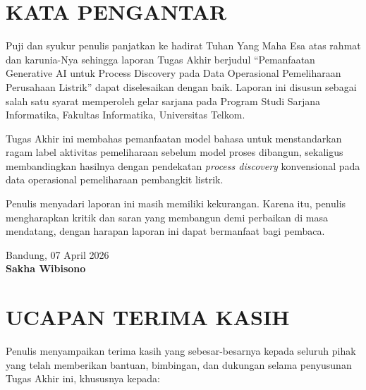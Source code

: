 \chapter*{KATA PENGANTAR}

Puji dan syukur penulis panjatkan ke hadirat Tuhan Yang Maha Esa atas rahmat dan karunia-Nya sehingga laporan Tugas Akhir berjudul ``Pemanfaatan Generative AI untuk Process Discovery pada Data Operasional Pemeliharaan Perusahaan Listrik'' dapat diselesaikan dengan baik. Laporan ini disusun sebagai salah satu syarat memperoleh gelar sarjana pada Program Studi Sarjana Informatika, Fakultas Informatika, Universitas Telkom.

Tugas Akhir ini membahas pemanfaatan model bahasa untuk menstandarkan ragam label aktivitas pemeliharaan sebelum model proses dibangun, sekaligus membandingkan hasilnya dengan pendekatan \textit{process discovery} konvensional pada data operasional pemeliharaan pembangkit listrik.

Penulis menyadari laporan ini masih memiliki kekurangan. Karena itu, penulis mengharapkan kritik dan saran yang membangun demi perbaikan di masa mendatang, dengan harapan laporan ini dapat bermanfaat bagi pembaca.

\vspace{1cm}

\begin{flushright}
  Bandung, 07 April 2026 \\[2cm]
  \textbf{Sakha Wibisono}
\end{flushright}

\chapter*{UCAPAN TERIMA KASIH}

Penulis menyampaikan terima kasih yang sebesar-besarnya kepada seluruh pihak yang telah memberikan bantuan, bimbingan, dan dukungan selama penyusunan Tugas Akhir ini, khususnya kepada:

